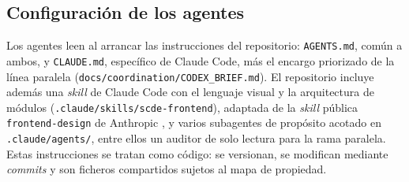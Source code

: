 \subsection{Configuración de los agentes}

Los agentes leen al arrancar las instrucciones del repositorio: \texttt{AGENTS.md}, común a
ambos, y \texttt{CLAUDE.md}, específico de Claude Code, más el encargo priorizado de la línea
paralela (\texttt{docs/coordination/CODEX\_BRIEF.md}). El repositorio incluye además una
\textit{skill} de Claude Code con el lenguaje visual y la arquitectura de módulos
(\texttt{.claude/skills/scde-frontend}), adaptada de la \textit{skill} pública
\texttt{frontend-design} de Anthropic \cite{anthropic_skills_frontend_design}, y varios
subagentes de propósito acotado en \texttt{.claude/agents/}, entre ellos un auditor de solo
lectura para la rama paralela. Estas instrucciones se tratan como código: se versionan,
se modifican mediante \textit{commits} y son ficheros compartidos sujetos al mapa de
propiedad.
